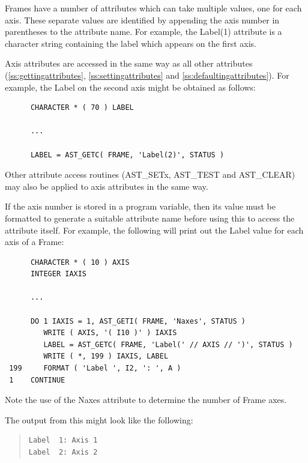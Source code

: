\documentclass[twoside,11pt]{article}
\newcommand{\htmlref}[2]{#1}
\newcommand{\secref}[1]{\S\ref{#1}}
\renewcommand{\secref}[1]{\ref{#1}}
\begin{document}
Frames have a number of attributes which can take multiple values, one
for each axis. These separate values are identified by appending the
axis number in parentheses to the attribute name. For example, the
Label(1) attribute is a character string containing the label which
appears on the first axis.

\htmlref{Axis}{Axis} attributes are accessed in the same way as all other attributes
(\secref{ss:gettingattributes}, \secref{ss:settingattributes} and
\secref{ss:defaultingattributes}). For example, the Label on the second
axis might be obtained as follows:

\small
\begin{verbatim}
      CHARACTER * ( 70 ) LABEL

      ...

      LABEL = AST_GETC( FRAME, 'Label(2)', STATUS )
\end{verbatim}
\normalsize

Other attribute access routines (AST\_SETx, \htmlref{AST\_TEST}{AST_TEST} and \htmlref{AST\_CLEAR}{AST_CLEAR})
may also be applied to axis attributes in the same way.

If the axis number is stored in a program variable, then its value
must be formatted to generate a suitable attribute name before using
this to access the attribute itself. For example, the following will
print out the Label value for each axis of a \htmlref{Frame}{Frame}:

\small
\begin{verbatim}
      CHARACTER * ( 10 ) AXIS
      INTEGER IAXIS

      ...

      DO 1 IAXIS = 1, AST_GETI( FRAME, 'Naxes', STATUS )
         WRITE ( AXIS, '( I10 )' ) IAXIS
         LABEL = AST_GETC( FRAME, 'Label(' // AXIS // ')', STATUS )
         WRITE ( *, 199 ) IAXIS, LABEL
 199     FORMAT ( 'Label ', I2, ': ', A )
 1    CONTINUE
\end{verbatim}
\normalsize

Note the use of the \htmlref{Naxes}{Naxes} attribute to determine the number of Frame
axes.

The output from this might look like the following:

\begin{quote}
\begin{verbatim}
Label  1: Axis 1
Label  2: Axis 2
\end{verbatim}
\end{quote}
\end{document}
